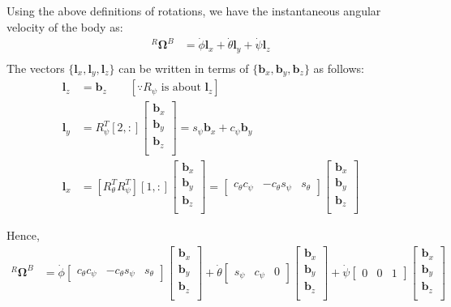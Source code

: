 Using the above definitions of rotations, we have the instantaneous angular velocity of the body as:
\begin{align*}
    {}^R\pmb \Omega^B &= \dot \phi \pmb l_x + \dot \theta \pmb l_y + \dot \psi \pmb l_z\\
\end{align*}
The vectors $\{ \pmb l_x, \pmb l_y, \pmb l_z\}$ can be written in terms of $\{ \pmb b_x, \pmb b_y, \pmb b_z\}$ as follows:
\begin{align*}
    \pmb l_z &= \pmb b_z \qquad [\because R_{\psi} \text{ is about } \pmb l_z]\\
    \pmb l_y &= R_{\psi}^T [2, :]\begin{bmatrix}
    \pmb b_x \\ \pmb b_y \\ \pmb b_z\\
\end{bmatrix} = s_{\psi} \pmb b_x + c_{\psi} \pmb b_y\\
    \pmb l_x &= [R_{\theta}^T R_{\psi}^T][1,:] \begin{bmatrix}
    \pmb b_x \\ \pmb b_y \\ \pmb b_z\\
\end{bmatrix} = \begin{bmatrix}
    c_{\theta}c_{\psi} & -c_{\theta}s_{\psi} & s_{\theta}
\end{bmatrix}\begin{bmatrix}
    \pmb b_x \\ \pmb b_y \\ \pmb b_z\\
\end{bmatrix}
\end{align*}

Hence,
\begin{align*}
    {}^R\pmb \Omega^B &=
        \dot \phi \begin{bmatrix} c_{\theta}c_{\psi} & -c_{\theta}s_{\psi} &
        s_{\theta} \end{bmatrix}\begin{bmatrix} \pmb b_x \\ \pmb b_y \\ \pmb
        b_z\\\end{bmatrix} +
        \dot \theta \begin{bmatrix} s_{\psi} & c_{\psi} & 0
        \end{bmatrix}\begin{bmatrix} \pmb b_x \\ \pmb b_y \\ \pmb
        b_z\\\end{bmatrix} +
        \dot \psi \begin{bmatrix} 0 & 0 & 1\end{bmatrix}
        \begin{bmatrix} \pmb b_x \\ \pmb b_y \\ \pmb
        b_z\\\end{bmatrix}
\end{align*}

